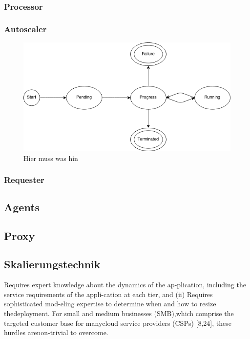 \documentclass[runningheads]{llncs}
\begin{document}
\subsubsection{Processor}
	
\subsubsection{Autoscaler}

\begin{figure}[h]
	\centering
	\includegraphics[width=0.8\linewidth,scale=0.8]{images/state.png}
	\caption{Hier muss was hin}
\end{figure}
	
\subsubsection{Requester}
	
\subsection{Agents}
	
\subsection{Proxy}

\subsection{Skalierungstechnik} \label{skalierungstechnik}

Requires expert knowledge about the dynamics of the ap-plication, including the service requirements of the appli-cation at each tier, and (ii) Requires sophisticated mod-eling expertise to determine when and how to resize thedeployment. For small and medium businesses (SMB),which comprise the targeted customer base for manycloud service providers (CSPs) [8,24], these hurdles arenon-trivial to overcome.
\end{document}
